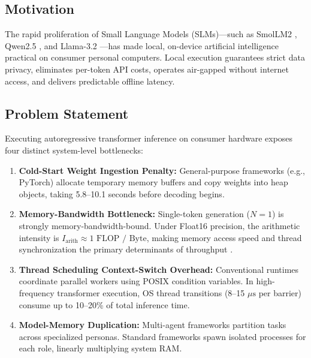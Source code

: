 \documentclass[a4paper,twocolumn,10pt]{article}
\begin{document}
\subsection{Motivation}
The rapid proliferation of Small Language Models (SLMs)---such as SmolLM2 \cite{allal2024smollm2}, Qwen2.5 \cite{qwen2024qwen25}, and Llama-3.2 \cite{dubey2024llama3}---has made local, on-device artificial intelligence practical on consumer personal computers. Local execution guarantees strict data privacy, eliminates per-token API costs, operates air-gapped without internet access, and delivers predictable offline latency.

\subsection{Problem Statement}
Executing autoregressive transformer inference on consumer hardware exposes four distinct system-level bottlenecks:

\begin{enumerate}
    \item \textbf{Cold-Start Weight Ingestion Penalty:} General-purpose frameworks (e.g., PyTorch) allocate temporary memory buffers and copy weights into heap objects, taking 5.8--10.1 seconds before decoding begins.
    \item \textbf{Memory-Bandwidth Bottleneck:} Single-token generation ($N = 1$) is strongly memory-bandwidth-bound. Under Float16 precision, the arithmetic intensity is $I_{\text{arith}} \approx 1 \text{ FLOP / Byte}$, making memory access speed and thread synchronization the primary determinants of throughput \cite{williams2009roofline}.
    \item \textbf{Thread Scheduling Context-Switch Overhead:} Conventional runtimes coordinate parallel workers using POSIX condition variables. In high-frequency transformer execution, OS thread transitions (8--15 $\mu\text{s}$ per barrier) consume up to 10--20\% of total inference time.
    \item \textbf{Model-Memory Duplication:} Multi-agent frameworks \cite{wu2023autogen} partition tasks across specialized personas. Standard frameworks spawn isolated processes for each role, linearly multiplying system RAM.
\end{enumerate}
\end{document}
